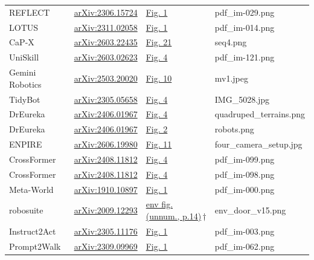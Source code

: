 \PassOptionsToPackage{svgnames,dvipsnames}{xcolor} \documentclass[acmsmall,screen,nonacm]{acmart}
\begin{document}
\begin{table}[t]
\begin{tabular}{@{}llll@{}}
REFLECT & \href{https://arxiv.org/abs/2306.15724}{arXiv:2306.15724} & \href{https://arxiv.org/abs/2306.15724}{Fig. 1} & pdf\_im-029.png \\
LOTUS & \href{https://arxiv.org/abs/2311.02058}{arXiv:2311.02058} & \href{https://arxiv.org/abs/2311.02058}{Fig. 1} & pdf\_im-014.png \\
CaP-X & \href{https://arxiv.org/abs/2603.22435}{arXiv:2603.22435} & \href{https://arxiv.org/abs/2603.22435}{Fig. 21} & seq4.png \\
UniSkill & \href{https://arxiv.org/abs/2603.02623}{arXiv:2603.02623} & \href{https://arxiv.org/abs/2603.02623}{Fig. 4} & pdf\_im-121.png \\
Gemini Robotics & \href{https://arxiv.org/abs/2503.20020}{arXiv:2503.20020} & \href{https://arxiv.org/abs/2503.20020}{Fig. 10} & mv1.jpeg \\
TidyBot & \href{https://arxiv.org/abs/2305.05658}{arXiv:2305.05658} & \href{https://arxiv.org/abs/2305.05658}{Fig. 4} & IMG\_5028.jpg \\
DrEureka & \href{https://arxiv.org/abs/2406.01967}{arXiv:2406.01967} & \href{https://arxiv.org/abs/2406.01967}{Fig. 4} & quadruped\_terrains.png \\
DrEureka & \href{https://arxiv.org/abs/2406.01967}{arXiv:2406.01967} & \href{https://arxiv.org/abs/2406.01967}{Fig. 2} & robots.png \\
ENPIRE & \href{https://arxiv.org/abs/2606.19980}{arXiv:2606.19980} & \href{https://arxiv.org/abs/2606.19980}{Fig. 11} & four\_camera\_setup.jpg \\
CrossFormer & \href{https://arxiv.org/abs/2408.11812}{arXiv:2408.11812} & \href{https://arxiv.org/abs/2408.11812}{Fig. 4} & pdf\_im-099.png \\
CrossFormer & \href{https://arxiv.org/abs/2408.11812}{arXiv:2408.11812} & \href{https://arxiv.org/abs/2408.11812}{Fig. 4} & pdf\_im-098.png \\
Meta-World & \href{https://arxiv.org/abs/1910.10897}{arXiv:1910.10897} & \href{https://arxiv.org/abs/1910.10897}{Fig. 1} & pdf\_im-000.png \\
robosuite & \href{https://arxiv.org/abs/2009.12293}{arXiv:2009.12293} & \href{https://arxiv.org/abs/2009.12293}{env fig. (unnum., p.14)}\,$\dagger$ & env\_door\_v15.png \\
Instruct2Act & \href{https://arxiv.org/abs/2305.11176}{arXiv:2305.11176} & \href{https://arxiv.org/abs/2305.11176}{Fig. 1} & pdf\_im-003.png \\
Prompt2Walk & \href{https://arxiv.org/abs/2309.09969}{arXiv:2309.09969} & \href{https://arxiv.org/abs/2309.09969}{Fig. 1} & pdf\_im-062.png \\

\end{tabular}
\end{table}
\end{document}
